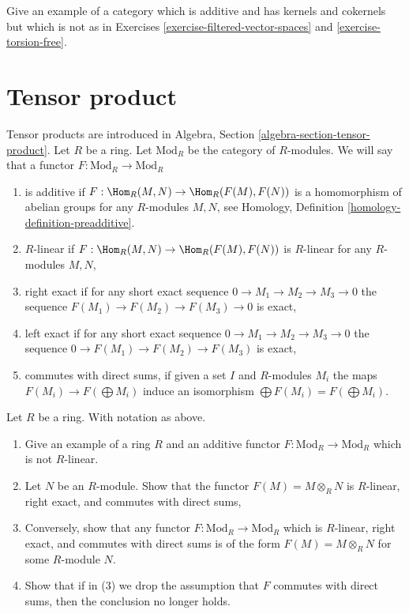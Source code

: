 \begin{exercise}
\label{exercise-other}
Give an example of a category which is additive and has kernels
and cokernels but which is not as in
Exercises \ref{exercise-filtered-vector-spaces} and
\ref{exercise-torsion-free}.
\end{exercise}





\section{Tensor product}
\label{section-tensor-product}

\noindent
Tensor products are introduced in Algebra, Section
\ref{algebra-section-tensor-product}.
Let $R$ be a ring. Let $\text{Mod}_R$ be the category of $R$-modules.
We will say that a functor $F : \text{Mod}_R \to \text{Mod}_R$
\begin{enumerate}
\item is additive if
$F : \Hom_R(M, N) \to \Hom_R(F(M), F(N))$
is a homomorphism of abelian groups
for any $R$-modules $M, N$, see
Homology, Definition \ref{homology-definition-preadditive}.
\item $R$-linear if $F : \Hom_R(M, N) \to \Hom_R(F(M), F(N))$ is $R$-linear
for any $R$-modules $M, N$,
\item right exact if for any short exact sequence
$0 \to M_1 \to M_2 \to M_3 \to 0$ the sequence
$F(M_1) \to F(M_2) \to F(M_3) \to 0$ is exact,
\item left exact if for any short exact sequence
$0 \to M_1 \to M_2 \to M_3 \to 0$ the sequence
$0 \to F(M_1) \to F(M_2) \to F(M_3)$ is exact,
\item commutes with direct sums, if given a set
$I$ and $R$-modules $M_i$ the maps
$F(M_i) \to F(\bigoplus M_i)$ induce an isomorphism
$\bigoplus F(M_i) = F(\bigoplus M_i)$.
\end{enumerate}

\begin{exercise}
\label{exercise-characterize-tensor-functor}
Let $R$ be a ring. With notation as above.
\begin{enumerate}
\item Give an example of a ring $R$ and an additive functor
$F : \text{Mod}_R \to \text{Mod}_R$ which is not $R$-linear.
\item Let $N$ be an $R$-module. Show that the functor
$F(M) = M \otimes_R N$ is $R$-linear,
right exact, and commutes with direct sums,
\item Conversely, show that any functor $F : \text{Mod}_R \to \text{Mod}_R$
which is $R$-linear,
right exact, and commutes with direct sums is of the
form $F(M) = M \otimes_R N$ for some $R$-module $N$.
\item Show that if in (3) we drop the assumption
that $F$ commutes with direct sums, then the conclusion no
longer holds.
\end{enumerate}
\end{exercise}





